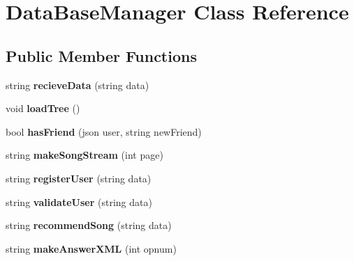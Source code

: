 \hypertarget{classDataBaseManager}{}\section{Data\+Base\+Manager Class Reference}
\label{classDataBaseManager}
\subsection*{Public Member Functions}
\begin{DoxyCompactItemize}
\item 
string {\bfseries recieve\+Data} (string data)\hypertarget{classDataBaseManager_a7a4019b86ffe1fa0bb3b1d7e704b6a62}{}\label{classDataBaseManager_a7a4019b86ffe1fa0bb3b1d7e704b6a62}

\item 
void {\bfseries load\+Tree} ()\hypertarget{classDataBaseManager_a42980e7596433e1e27ee9c9a83a0cb05}{}\label{classDataBaseManager_a42980e7596433e1e27ee9c9a83a0cb05}

\item 
bool {\bfseries has\+Friend} (json user, string new\+Friend)\hypertarget{classDataBaseManager_a3435c377df17950ec054af713fdba8fc}{}\label{classDataBaseManager_a3435c377df17950ec054af713fdba8fc}

\item 
string {\bfseries make\+Song\+Stream} (int page)\hypertarget{classDataBaseManager_ad1af0cd3da9b3b007dea8c5c90973580}{}\label{classDataBaseManager_ad1af0cd3da9b3b007dea8c5c90973580}

\item 
string {\bfseries register\+User} (string data)\hypertarget{classDataBaseManager_ad3765be26ed1454bdedfccfc822e82b0}{}\label{classDataBaseManager_ad3765be26ed1454bdedfccfc822e82b0}

\item 
string {\bfseries validate\+User} (string data)\hypertarget{classDataBaseManager_af538ddac2d8b1808116f274106129676}{}\label{classDataBaseManager_af538ddac2d8b1808116f274106129676}

\item 
string {\bfseries recommend\+Song} (string data)\hypertarget{classDataBaseManager_a70e40bd8eb192244196dabd0923c0212}{}\label{classDataBaseManager_a70e40bd8eb192244196dabd0923c0212}

\item 
string {\bfseries make\+Answer\+X\+ML} (int opnum)\hypertarget{classDataBaseManager_ad5aaece220324aae2f541ae344529cc8}{}\label{classDataBaseManager_ad5aaece220324aae2f541ae344529cc8}


\end{DoxyCompactItemize}
